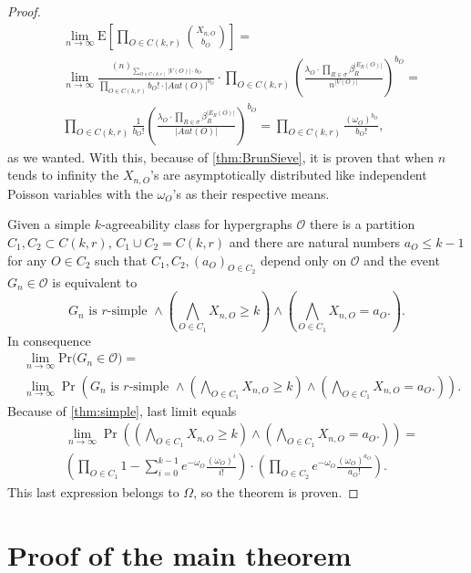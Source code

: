 \documentclass[12pt,notitlepage,a4paper]{article}
\theoremstyle{definition}
\newcommand{\Ln}{\lim\limits_{n\to \infty}}
\newcommand{\PR}[1]{\mathrm{Pr}\big(#1\big)}
\begin{document}
\begin{proof}
\begin{align*}
&\Ln \mathrm{E}\left[
\prod_{O\in C(k,r)}
\binom{X_{n,O}}{b_O}
\right]=\\
&
\Ln
\frac{(n)_{\sum_{O\in C(k,r)} |V(O)|\cdot b_O}}
{\prod_{O\in C(k,r)} b_O!\cdot |Aut(O)|^{b_O}} \cdot
\prod_{O\in C(k,r)}
\left( 
\frac{\lambda_O \cdot \prod_{R\in \sigma} \beta_R^{|E_R(O)|}}{n^{|V(O)|}}
\right)^{b_O} = \\
&\prod_{O\in C(k,r)} \frac{1}{b_O!}\left(\frac{\lambda_O  
\cdot \prod_{R\in \sigma} \beta_R^{|E_R(O)|} }{|Aut(O)|}
\right)^{b_O}= \prod_{O\in C(k,r)} 
\frac{(\omega_O)^{b_O}}{b_O!},
\end{align*}
as we wanted. With this, because of \cref{thm:BrunSieve}, it 
is proven that when $n$ tends to infinity
the $X_{n,O}$'s are asymptotically distributed 
like independent
Poisson variables with the $\omega_O$'s as their respective means.\par
Given a simple $k$-agreeability class for hypergraphs $\mathcal{O}$ there 
is a partition $C_1, C_2\subset C(k,r)$, $C_1\cup C_2=C(k,r)$ 
and there are natural numbers $a_O\leq k-1$ for any $O\in C_2$ such that
$C_1, C_2, (a_O)_{O\in C_2}$ depend only on $\mathcal{O}$ and
the event $G_n\in \mathcal{O}$ is equivalent to
\[
G_n \text{ is $r$-simple } \wedge
\left(
 \bigwedge_{O\in C_1}
 X_{n,O}\geq k
\right)
\wedge
\left(
\bigwedge_{O\in C_1}
X_{n,O}=a_O.
\right).
\]
In consequence
\begin{align*}
 & \Ln
 \PR{G_n \in \mathcal{O}}=\\
 &\Ln
 \Pr \left(
 G_n \text{ is $r$-simple } \wedge
 \left(
 \bigwedge_{O\in C_1}
 X_{n,O}\geq k
 \right)
 \wedge
 \left(
 \bigwedge_{O\in C_1}
 X_{n,O}=a_O.
 \right)
 \right).
\end{align*}
Because of \cref{thm:simple}, last limit equals
\begin{align*}
&\Ln
\Pr \left(
\left(
\bigwedge_{O\in C_1}
X_{n,O}\geq k
\right)
\wedge
\left(
\bigwedge_{O\in C_1}
X_{n,O}=a_O.
\right)
\right)
=\\
&
\left(
\prod_{O\in C_1}
1-\sum_{i=0}^{k-1} e^{-\omega_O}\frac{(\omega_O)^i}{i!}
\right)
\cdot
\left(
\prod_{O\in C_2}
e^{-\omega_O}\frac{(\omega_O)^{a_O}}{a_O!}
\right)
.
\end{align*}
This last expression belongs to $\Omega$, so the theorem is proven. 
\end{proof}

\section{Proof of the main theorem}
\end{document}
